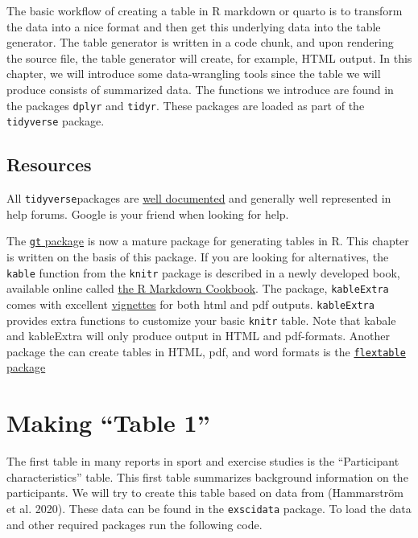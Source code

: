 \documentclass[
  11pt,
  letterpaper,
]{scrbook}
\begin{document}
The basic workflow of creating a table in R markdown or quarto is to
transform the data into a nice format and then get this underlying data
into the table generator. The table generator is written in a code
chunk, and upon rendering the source file, the table generator will
create, for example, HTML output. In this chapter, we will introduce
some data-wrangling tools since the table we will produce consists of
summarized data. The functions we introduce are found in the packages
\texttt{dplyr} and \texttt{tidyr}. These packages are loaded as part of
the \texttt{tidyverse} package.

\hypertarget{resources-1}{%
\subsection{Resources}\label{resources-1}}

All \texttt{tidyverse}packages are
\href{https://www.tidyverse.org/}{well documented} and generally well
represented in help forums. Google is your friend when looking for help.

The \href{https://gt.rstudio.com/}{\texttt{gt} package} is now a mature
package for generating tables in R. This chapter is written on the basis
of this package. If you are looking for alternatives, the \texttt{kable}
function from the \texttt{knitr} package is described in a newly
developed book, available online called
\href{https://bookdown.org/yihui/rmarkdown-cookbook/kable.html}{the R
Markdown Cookbook}. The package, \texttt{kableExtra} comes with
excellent
\href{https://cran.r-project.org/web/packages/kableExtra/}{vignettes}
for both html and pdf outputs. \texttt{kableExtra} provides extra
functions to customize your basic \texttt{knitr} table. Note that kabale
and kableExtra will only produce output in HTML and pdf-formats. Another
package the can create tables in HTML, pdf, and word formats is the
\href{https://ardata-fr.github.io/flextable-book/}{\texttt{flextable}
package}

\hypertarget{making-table-1}{%
\section{Making ``Table 1''}\label{making-table-1}}

The first table in many reports in sport and exercise studies is the
``Participant characteristics'' table. This first table summarizes
background information on the participants. We will try to create this
table based on data from (Hammarström et al. 2020). These data can be
found in the \texttt{exscidata} package. To load the data and other
required packages run the following code.
\end{document}
